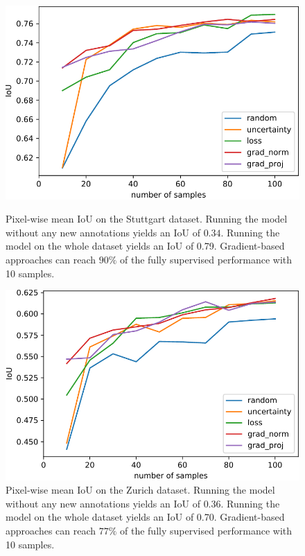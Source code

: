 \documentclass[letterpaper, 10 pt, conference]{ieeeconf}  %
\begin{document}
    \begin{figure}
    \centering
    \includegraphics[width=0.8\linewidth]{pics/pw_iou_stuttgart-crop.pdf}
   		\caption{Pixel-wise mean IoU on the Stuttgart dataset. Running the model without any new annotations yields an IoU of $0.34$. Running the model on the whole dataset yields an IoU of 0.79. Gradient-based approaches can reach $90\%$ of the fully supervised performance with 10 samples.}
		\label{fig:iou_stuttgart}    		
    \vspace{1.3em}
    \centering
    \includegraphics[width=0.8\linewidth]{pics/pw_iou_zurich-crop.pdf}
   		\caption{Pixel-wise mean IoU on the Zurich dataset. Running the model without any new annotations yields an IoU of $0.36$. Running the model on the whole dataset yields an IoU of 0.70. Gradient-based approaches can reach $77\%$ of the fully supervised performance with 10 samples.}
		\label{fig:iou_zurich}    		
   \end{figure}
   
\end{document}
